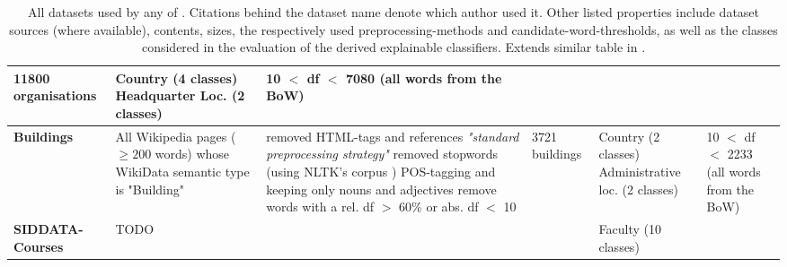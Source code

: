 \begin{landscape}
\begin{table}[]
{\begin{tabular}{@{}llllll@{}}
        		11800 organisations &
        		\specialcell[l]{ \tabitem Country (4 classes)\\ \tabitem Headquarter Loc. (2 classes)} &
        		\specialcell[l]{ 10 $<$ \acrshort{df} $<$ 7080 \\ (all words from the BoW)} \\ \midrule
        	\textbf{Buildings\footnoteref{fnote:for_alshaikh2019} \cite{Alshaikh2020}} &
        		\specialcell[l]{All Wikipedia pages ($\geq 200$ words) whose \\ WikiData semantic type is "Building"} &
        		\specialcell[l]{ \tabitem removed HTML-tags and references \\ \tabitem \textit{"standard preprocessing strategy"} \cite[137]{Alshaikh2019} \\ \tabitem removed stopwords (using NLTK's corpus \cite{loper-bird-2002-nltk})\\ \tabitem POS-tagging and keeping only nouns and adjectives \\ \tabitem remove words with a rel. \acrshort{df}  $>$ 60\% or abs. \acrshort{df} $<$ 10 } &
        		3721 buildings &
        		\specialcell[l]{ \tabitem Country (2 classes)\\ \tabitem Administrative loc. (2 classes)} &
        		\specialcell[l]{10 $<$ \acrshort{df} $<$ 2233 \\ (all words from the BoW) }\\ \Xhline{4\arrayrulewidth}
        	\textbf{SIDDATA-Courses} &
        		TODO &
        		&
        		&
        		\tabitem Faculty (10 classes) 
        		\\ 
		\end{tabular}
		\caption[All datasets used by any of \mainalgos]{All datasets used by any of \mainalgos. Citations behind the dataset name denote which author used it. Other listed properties include dataset sources (where available), contents, sizes, the respectively used preprocessing-methods and candidate-word-thresholds, as well as the classes considered in the evaluation of the derived explainable classifiers.  Extends similar table in \cite{Alshaikh2020}.}
		\label{tab:all_datasets}
	}
	\end{table}
\end{landscape}


\restoregeometry %


